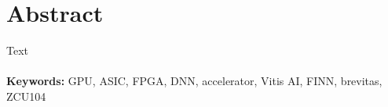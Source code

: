 \chapter*{\centering Abstract}

    Text
    \\\\
    \textbf{Keywords:}
    GPU, ASIC, FPGA, DNN, accelerator, Vitis AI, FINN, brevitas, ZCU104
